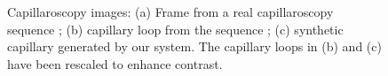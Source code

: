 \begin{figure}
\centering
{}
%
\caption{Capillaroscopy images: %
(a) Frame from a real capillaroscopy sequence%
; (b) capillary loop from the sequence%
; (c) synthetic capillary generated by our system.
The capillary loops in (b) and (c) have been rescaled to enhance contrast.}
\label{fig_example_images}
\end{figure}
